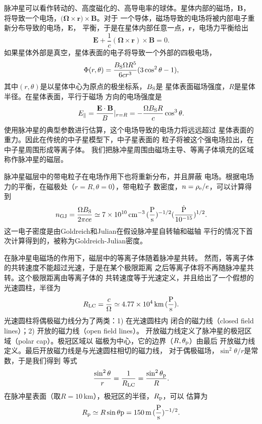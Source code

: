 脉冲星可以看作转动的、高度磁化的、高导电率的球体。星体内部的磁场，$\mathbf{B}$，
将导致一个电场，$(\mathbf{\Omega\times r)\times B}$。对于
一个导体，磁场导致的电场将被内部电子重新分布导致的电场，$\mathbf{E}$，
平衡，于是在星体内部任意一点，$\mathbf{r}$，电场力平衡给出
\begin{equation}
\mathbf{E}+\frac{1}{c}\mathbf{(\Omega\times r)\times B}=0.
\end{equation}
如果星体外部是真空，星体表面的电子将导致一个外部的四极电场，
\begin{equation}
\Phi(r,\theta)=\frac{B_{\rm{S}}\Omega R^{5}}{6cr^{3}}(3\cos^{2}{\theta}-1),
\end{equation}
其中$(r,\theta)$是以星体中心为原点的极坐标系，$B_{\rm{S}}$是
星体表面磁场强度，$R$是星体半径。在星体表面，平行于磁场
方向的电场强度是
\begin{equation}
E_{\parallel}=\frac{\mathbf{E\cdot B}}{B}\arrowvert_{r=R}=-\frac{\Omega B_{\rm{S}}R}{c}\cos^{3}{\theta}.
\end{equation}
使用脉冲星的典型参数进行估算，这个电场导致的电场力将远远超过
星体表面的重力。因此在传统的中子星模型下，中子星表面的
粒子将被这个强电场拉出，在中子星周围形成等离子体。
我们把脉冲星周围由磁场主导、等离子体填充的区域称作脉冲星的磁层。

脉冲星磁层中的带电粒子在电场作用下也将重新分布，并且屏蔽
电场。根据电场力的平衡，在磁极处（$r=R,\theta=0$），带电粒子
数密度，$n=\rho_{\rm{e}}/e$，可以计算得到
\begin{equation}
n_{\rm{GJ}}=\frac{\Omega B_{\rm{S}}}{2\pi ce}\simeq 7\times10^{10}\,\rm{cm^{-3}}\,(\frac{P}{s})^{-1/2}(\frac{\dot{P}}{10^{-15}})^{1/2}.
\end{equation}
这一电子密度是由Goldreich和Julian在假设脉冲星自转轴和磁轴
平行的情况下首次计算得到的\supercite{gj69}，被称为Goldreich-Julian密度。

在脉冲星电磁场的作用下，磁层中的等离子体随着脉冲星共转。
然而，等离子体的共转速度不能超过光速，于是在某个极限距离
之后等离子体将不再随脉冲星共转。这个极限距离由等离子体的
共转速度等于光速定义，并且给出了一个假想的光速圆柱，半径为
\begin{equation}
R_{\rm{LC}}=\frac{c}{\Omega}\simeq 4.77\times10^{4}\,\rm{km}\,(\frac{P}{s}).
\end{equation}
光速圆柱将偶极磁力线分为了两类：1) 在光速圆柱内
闭合的磁力线（closed field lines）；2) 开放的磁力线（open field lines）。
开放磁力线定义了脉冲星的极冠区域（polar cap）。极冠区域以
磁极为中心，它的边界（$R,\theta_{\rm{p}}$）由最后
开放磁力线定义。最后开放磁力线是与光速圆柱相切的磁力线，
对于偶极磁场，$\sin^{2}{\theta}/r$是常数，于是我们得到
等式
\begin{equation}
\frac{\sin^{2}{\theta}}{r}=\frac{1}{R_{\rm{LC}}}=\frac{\sin^{2}{\theta_{\rm{p}}}}{R}.
\end{equation}
在脉冲星表面（取$R=10$\,km），极冠区的半径，$R_{\rm{p}}$，可以
估算为
\begin{equation}
R_{\rm{p}}\simeq R\sin{\theta{\rm{p}}}=150\,\rm{m}\,(\frac{P}{s})^{-1/2}.
\end{equation}

